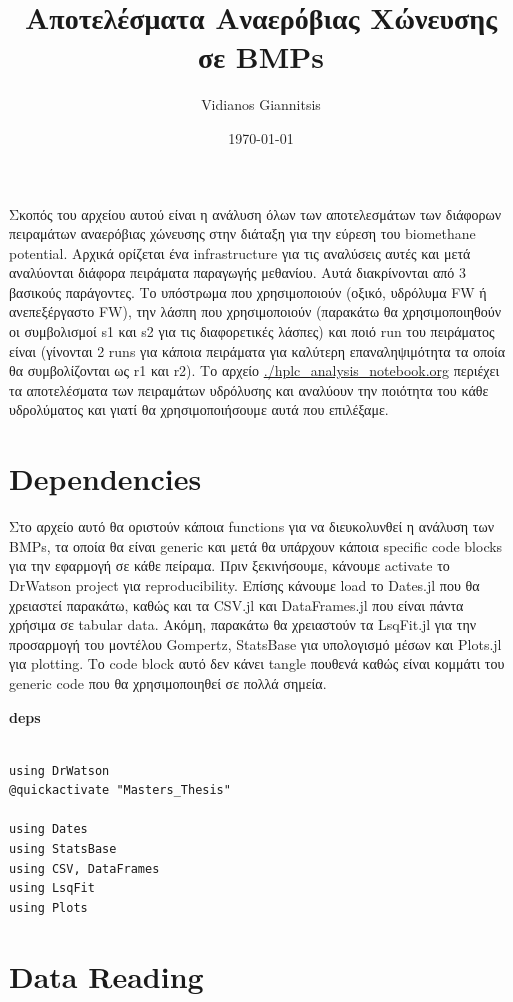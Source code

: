 \documentclass[11pt]{article}
\author{Vidianos Giannitsis}
\date{\today}
\title{Αποτελέσματα Αναερόβιας Χώνευσης σε BMPs}
\begin{document}
\maketitle
\tableofcontents

Σκοπός του αρχείου αυτού είναι η ανάλυση όλων των αποτελεσμάτων των διάφορων πειραμάτων αναερόβιας χώνευσης στην διάταξη για την εύρεση του biomethane potential. Αρχικά ορίζεται ένα infrastructure για τις αναλύσεις αυτές και μετά αναλύονται διάφορα πειράματα παραγωγής μεθανίου. Αυτά διακρίνονται από 3 βασικούς παράγοντες. Το υπόστρωμα που χρησιμοποιούν (οξικό, υδρόλυμα FW ή ανεπεξέργαστο FW), την λάσπη που χρησιμοποιούν (παρακάτω θα χρησιμοποιηθούν οι συμβολισμοί s1 και s2 για τις διαφορετικές λάσπες) και ποιό run του πειράματος είναι (γίνονται 2 runs για κάποια πειράματα για καλύτερη επαναληψιμότητα τα οποία θα συμβολίζονται ως r1 και r2). Το αρχείο \url{./hplc\_analysis\_notebook.org} περιέχει τα αποτελέσματα των πειραμάτων υδρόλυσης και αναλύουν την ποιότητα του κάθε υδρολύματος και γιατί θα χρησιμοποιήσουμε αυτά που επιλέξαμε.

\section{Dependencies}
\label{sec:orgc83a4c3}
Στο αρχείο αυτό θα οριστούν κάποια functions για να διευκολυνθεί η ανάλυση των BMPs, τα οποία θα είναι generic και μετά θα υπάρχουν κάποια specific code blocks για την εφαρμογή σε κάθε πείραμα. Πριν ξεκινήσουμε, κάνουμε activate το DrWatson project για reproducibility. Επίσης κάνουμε load το Dates.jl που θα χρειαστεί παρακάτω, καθώς και τα CSV.jl και DataFrames.jl που είναι πάντα χρήσιμα σε tabular data. Ακόμη, παρακάτω θα χρειαστούν τα LsqFit.jl για την προσαρμογή του μοντέλου Gompertz, StatsBase για υπολογισμό μέσων και Plots.jl για plotting. Το code block αυτό δεν κάνει tangle πουθενά καθώς είναι κομμάτι του generic code που θα χρησιμοποιηθεί σε πολλά σημεία.

\textbf{deps}
\begin{verbatim}

using DrWatson
@quickactivate "Masters_Thesis"

using Dates
using StatsBase
using CSV, DataFrames
using LsqFit
using Plots

\end{verbatim}

\section{Data Reading}
\label{sec:orge6b91cd}
\end{document}
